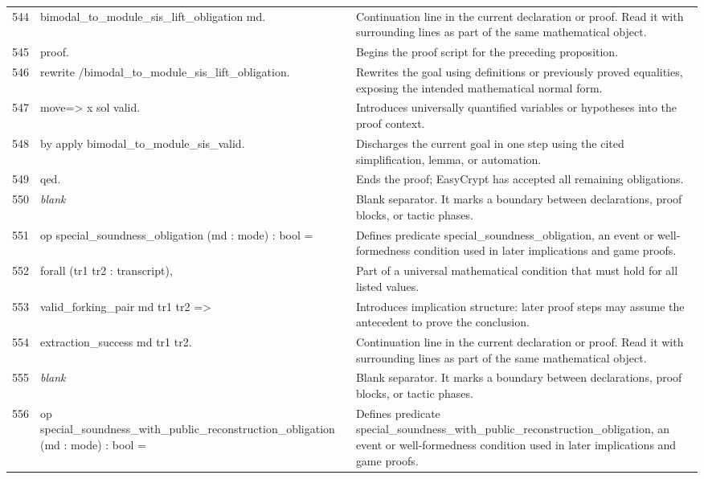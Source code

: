 \documentclass[10pt]{article}
\begin{document}
\begin{longtable}{r L{0.53\textwidth} L{0.37\textwidth}}
544 & {\ttfamily\scriptsize   bimodal\_to\_module\_sis\_lift\_obligation md.} & Continuation line in the current declaration or proof.  Read it with surrounding lines as part of the same mathematical object. \\
545 & {\ttfamily\scriptsize proof.} & Begins the proof script for the preceding proposition. \\
546 & {\ttfamily\scriptsize rewrite /bimodal\_to\_module\_sis\_lift\_obligation.} & Rewrites the goal using definitions or previously proved equalities, exposing the intended mathematical normal form. \\
547 & {\ttfamily\scriptsize move=> x sol valid.} & Introduces universally quantified variables or hypotheses into the proof context. \\
548 & {\ttfamily\scriptsize by apply bimodal\_to\_module\_sis\_valid.} & Discharges the current goal in one step using the cited simplification, lemma, or automation. \\
549 & {\ttfamily\scriptsize qed.} & Ends the proof; EasyCrypt has accepted all remaining obligations. \\
550 & {\ttfamily\scriptsize \emph{blank}} & Blank separator.  It marks a boundary between declarations, proof blocks, or tactic phases. \\
551 & {\ttfamily\scriptsize op special\_soundness\_obligation (md : mode) : bool =} & Defines predicate special\_soundness\_obligation, an event or well-formedness condition used in later implications and game proofs. \\
552 & {\ttfamily\scriptsize   forall (tr1 tr2 : transcript),} & Part of a universal mathematical condition that must hold for all listed values. \\
553 & {\ttfamily\scriptsize     valid\_forking\_pair md tr1 tr2 =>} & Introduces implication structure: later proof steps may assume the antecedent to prove the conclusion. \\
554 & {\ttfamily\scriptsize     extraction\_success md tr1 tr2.} & Continuation line in the current declaration or proof.  Read it with surrounding lines as part of the same mathematical object. \\
555 & {\ttfamily\scriptsize \emph{blank}} & Blank separator.  It marks a boundary between declarations, proof blocks, or tactic phases. \\
556 & {\ttfamily\scriptsize op special\_soundness\_with\_public\_reconstruction\_obligation (md : mode) : bool =} & Defines predicate special\_soundness\_with\_public\_reconstruction\_obligation, an event or well-formedness condition used in later implications and game proofs. \\

\end{longtable}
\end{document}
